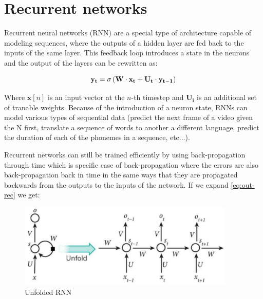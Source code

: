 
\section{Recurrent networks}

Recurrent neural networks (RNN) are a special type of architecture capable of modeling sequences, where the outputs of a hidden layer are fed back to the inputs of the same layer. This feedback loop introduces a state in the neurons and the output of the layers can be rewritten as:

\begin{equation}
    \centering
    \mathbf{y_t} = \sigma \left ( \mathbf{W} \cdot \mathbf{x_t} + \mathbf{U_t} \cdot \mathbf{y_{t-1}} \right )
    \label{eq:out-rec}
\end{equation}

Where $\mathbf{x}[n]$ is an input vector at the $n$-th timestep and $\mathbf{U_i}$ is an additional set of tranable weights. Because of the introduction of a neuron state, RNNs can model various types of sequential data (predict the next frame of a video given the N first, translate a sequence of words to another a different language, predict the duration of each of the phonemes in a sequence, etc...).

Recurrent networks can still be trained efficiently by using back-propagation through time \cite{werbos1990backpropagation} which is specific case of back-propagation where the errors are also back-propagation back in time in the same ways that they are propagated backwards from the outputs to the inputs of the network. If we expand \ref{eq:out-rec} we get:

\begin{figure}
    \centering
    \includegraphics[height=4cm]{figures/unfold}
    \caption{Unfolded RNN}
    \label{fig:unfold}
\end{figure}

